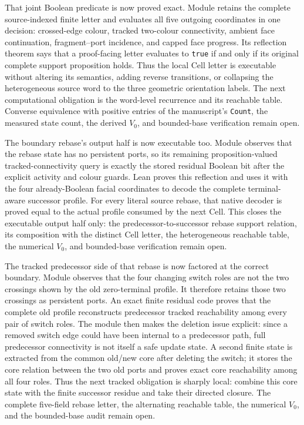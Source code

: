 \documentclass[11pt]{article}
\theoremstyle{definition}
\begin{document}
That joint Boolean predicate is now proved exact.  Module
retains the complete source-indexed finite letter and evaluates all five
outgoing coordinates in one decision: crossed-edge colour, tracked
two-colour connectivity, ambient face continuation, fragment--port incidence,
and capped face progress.  Its reflection theorem says that a proof-facing
letter evaluates to \texttt{true} if and only if its original complete
support proposition holds.  Thus the local Cell letter is executable without
altering its semantics, adding reverse transitions, or collapsing the
heterogeneous source word to the three geometric orientation labels.  The
next computational obligation is the word-level recurrence and its reachable
table.  Converse equivalence with positive entries of the manuscript's
\texttt{Count}, the measured state count, the derived $V_0$, and bounded-base
verification remain open.

The boundary rebase's output half is now executable too.  Module
observes that the rebase state has no persistent ports, so its remaining
proposition-valued tracked-connectivity query is exactly the stored residual
Boolean bit after the explicit activity and colour guards.  Lean proves this
reflection and uses it with the four already-Boolean facial coordinates to
decode the complete terminal-aware successor profile.  For every literal
source rebase, that native decoder is proved equal to the actual profile
consumed by the next Cell.  This closes the executable output half only: the
predecessor-to-successor rebase support relation, its composition with the
distinct Cell letter, the heterogeneous reachable table, the numerical
$V_0$, and bounded-base verification remain open.

The tracked predecessor side of that rebase is now factored at the correct
boundary.  Module
observes that the four changing switch roles are not the two crossings shown
by the old zero-terminal profile.  It therefore retains those two crossings
as persistent ports.  An exact finite residual code proves that the complete
old profile reconstructs predecessor tracked reachability among every pair of
switch roles.  The module then makes the deletion issue explicit: since a
removed switch edge could have been internal to a predecessor path, full
predecessor connectivity is not itself a safe update state.  A second finite
state is extracted from the common old/new core after deleting the switch; it
stores the core relation between the two old ports and proves exact core
reachability among all four roles.  Thus the next tracked obligation is
sharply local: combine this core state with the finite successor residue and
take their directed closure.  The complete five-field rebase letter, the
alternating reachable table, the numerical $V_0$, and the bounded-base audit
remain open.
\end{document}
